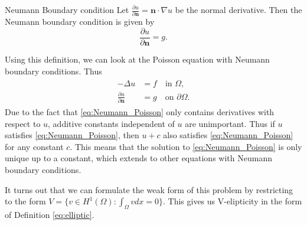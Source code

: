 

\begin{defn}{Neumann Boundary condition}
    Let $\frac{\partial u}{\partial \mathbf{n}}= \mathbf{n}\cdot \nabla u$ be the normal derivative. Then the Neumann boundary condition is given by
    \begin{equation}
        \frac{\partial u}{\partial \mathbf{n}}  = g.
    \end{equation}
\end{defn}
Using this definition, we can look at the Poisson equation with Neumann boundary conditions. Thus
\begin{align}
\label{eq:Neumann_Poisson}
\begin{split}
    -\Delta u &= f \quad \text{in } \Omega, \\
    \frac{\partial u}{\partial \mathbf{n}} &= g \quad \text{on } \partial \Omega.
\end{split}
\end{align}
Due to the fact that \eqref{eq:Neumann_Poisson} only contains derivatives with respect to $u$,
 additive constants independent of $u$ are unimportant.
Thus if $u$ satisfies \eqref{eq:Neumann_Poisson}, then $u + c$ also satisfies \eqref{eq:Neumann_Poisson} for any constant $c$.
This means that the solution to \eqref{eq:Neumann_Poisson} is only unique up to a constant,
 which extends to other equations with Neumann boundary conditions.

It turns out that we can formulate the weak form of this problem by restricting to the form $V=\{v\in H^1(\Omega):\int_{\Omega}vdx=0\}.$
This gives us V-elipticity in the form of Definition \eqref{eq:elliptic}. 

